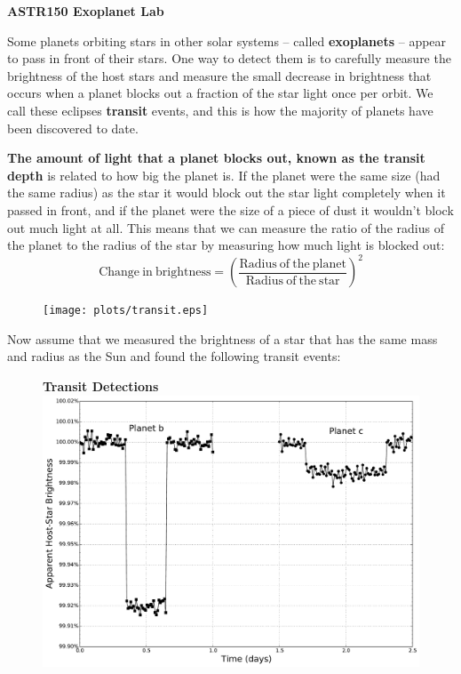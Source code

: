 \documentclass[12pt]{article}
\begin{document}

\begin{center}
\bf ASTR150 Exoplanet Lab
\end{center}

Some planets orbiting stars in other solar systems -- called {\bf exoplanets} -- appear to pass in front of their stars. One way to detect them is to carefully measure the brightness of the host stars and measure the small decrease in brightness that occurs when a planet blocks out a fraction of the star light once per orbit.  We call these eclipses {\bf transit} events, and this is how the majority of planets have been discovered to date.

{\bf The amount of light that a planet blocks out, known as the transit depth} is related to how big the planet is. If the planet were the same size (had the same radius) as the star it would block out the star light completely when it passed in front, and if the planet were the size of a piece of dust it wouldn't block out much light at all. This means that we can measure the ratio of the radius of the planet to the radius of the star by measuring how much light is blocked out: 
\begin{equation}
\mathrm{Change~in~brightness} = \left( \frac{\mathrm{Radius~of~the~planet}}{\mathrm{Radius~of~the~star}} \right)^2 \label{eqn:depth}
\end{equation}
\begin{figure}[h!]
\centering
\texttt{[image: plots/transit.eps]}
\end{figure}

Now assume that we measured the brightness of a star that has the same mass and radius as the Sun and found the following transit events:
\pagebreak

\begin{figure}[h!]
\centering
{\bf Transit Detections} \\
\includegraphics[scale=0.5]{plots/faketransit.pdf}
\end{figure}
\end{document}
